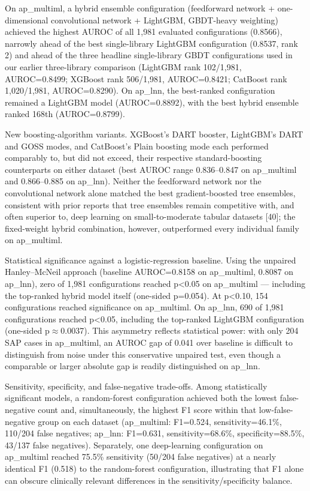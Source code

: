 \documentclass[10pt]{article} %
\begin{document}
On ap\_multiml, a hybrid ensemble configuration (feedforward network + one-dimensional convolutional network + LightGBM, GBDT-heavy weighting) achieved the highest AUROC of all 1,981 evaluated configurations (0.8566), narrowly ahead of the best single-library LightGBM configuration (0.8537, rank 2) and ahead of the three headline single-library GBDT configurations used in our earlier three-library comparison (LightGBM rank 102/1,981, AUROC=0.8499; XGBoost rank 506/1,981, AUROC=0.8421; CatBoost rank 1,020/1,981, AUROC=0.8290). On ap\_lnn, the best-ranked configuration remained a LightGBM model (AUROC=0.8892), with the best hybrid ensemble ranked 168th (AUROC=0.8799).

New boosting-algorithm variants. XGBoost's DART booster, LightGBM's DART and GOSS modes, and CatBoost's Plain boosting mode each performed comparably to, but did not exceed, their respective standard-boosting counterparts on either dataset (best AUROC range 0.836--0.847 on ap\_multiml and 0.866--0.885 on ap\_lnn). Neither the feedforward network nor the convolutional network alone matched the best gradient-boosted tree ensembles, consistent with prior reports that tree ensembles remain competitive with, and often superior to, deep learning on small-to-moderate tabular datasets [40]; the fixed-weight hybrid combination, however, outperformed every individual family on ap\_multiml.

Statistical significance against a logistic-regression baseline. Using the unpaired Hanley--McNeil approach (baseline AUROC=0.8158 on ap\_multiml, 0.8087 on ap\_lnn), zero of 1,981 configurations reached p<0.05 on ap\_multiml --- including the top-ranked hybrid model itself (one-sided p=0.054). At p<0.10, 154 configurations reached significance on ap\_multiml. On ap\_lnn, 690 of 1,981 configurations reached p<0.05, including the top-ranked LightGBM configuration (one-sided p$\approx$0.0037). This asymmetry reflects statistical power: with only 204 SAP cases in ap\_multiml, an AUROC gap of 0.041 over baseline is difficult to distinguish from noise under this conservative unpaired test, even though a comparable or larger absolute gap is readily distinguished on ap\_lnn.

Sensitivity, specificity, and false-negative trade-offs. Among statistically significant models, a random-forest configuration achieved both the lowest false-negative count and, simultaneously, the highest F1 score within that low-false-negative group on each dataset (ap\_multiml: F1=0.524, sensitivity=46.1\%, 110/204 false negatives; ap\_lnn: F1=0.631, sensitivity=68.6\%, specificity=88.5\%, 43/137 false negatives). Separately, one deep-learning configuration on ap\_multiml reached 75.5\% sensitivity (50/204 false negatives) at a nearly identical F1 (0.518) to the random-forest configuration, illustrating that F1 alone can obscure clinically relevant differences in the sensitivity/specificity balance.
\end{document}

